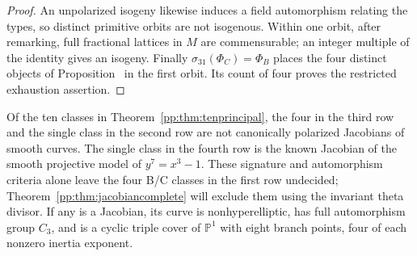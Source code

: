 \begin{proof}
An unpolarized isogeny likewise induces a field automorphism relating
the types, so distinct primitive orbits are not isogenous. Within one
orbit, after remarking, full fractional lattices in $M$ are
commensurable; an integer multiple of the identity gives an isogeny.
Finally $\sigma_{31}(\Phi_C)=\Phi_B$ places the four distinct
objects of Proposition~ in the first
orbit. Its count of four proves the restricted exhaustion assertion.
\end{proof}

\begin{corollary}
\label{pp:cor:jacobianlist}
Of the ten classes in Theorem~\ref{pp:thm:tenprincipal}, the four in
the third row and the single class in the second row are not
canonically polarized Jacobians of smooth curves. The single class
in the fourth row is the known Jacobian of the smooth projective
model of $y^7=x^3-1$.
These signature and automorphism criteria alone leave the four B/C
classes in the first row undecided; Theorem~\ref{pp:thm:jacobiancomplete}
will exclude them using the invariant theta divisor.
If any is a Jacobian, its curve is nonhyperelliptic, has full
automorphism group $C_3$, and is a cyclic triple cover of
$\mathbb P^1$ with eight branch points, four of each nonzero
inertia exponent.
\end{corollary}
